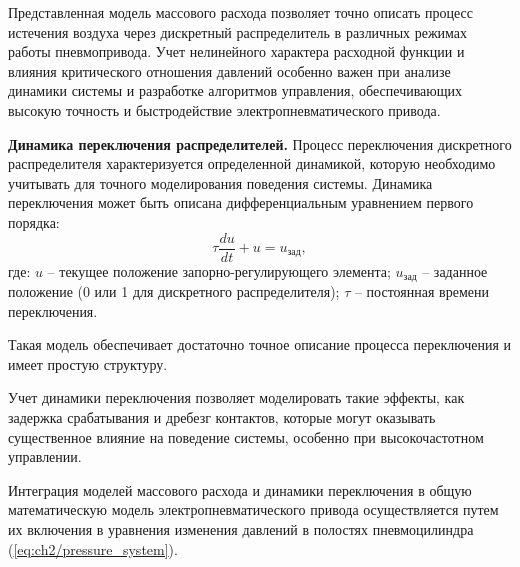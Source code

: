 Представленная модель массового расхода позволяет точно описать процесс истечения
воздуха через дискретный распределитель в различных режимах работы
пневмопривода. Учет нелинейного характера расходной функции и
влияния критического отношения давлений особенно важен при анализе динамики
системы и разработке алгоритмов управления, обеспечивающих высокую точность
и быстродействие электропневматического привода.

\textbf{Динамика переключения распределителей.}
Процесс переключения дискретного распределителя характеризуется
определенной динамикой, которую необходимо учитывать для точного моделирования поведения
системы. Динамика переключения может быть описана дифференциальным уравнением первого порядка:
\begin{equation}
	\label{eq:ch2/switching_dynamics}
	\tau \frac{du}{dt} + u = u_{\text{зад}},
\end{equation}
где:
$u$ -- текущее положение запорно-регулирующего элемента;
$u_{\text{зад}}$ -- заданное положение (0 или 1 для дискретного распределителя);
$\tau$ -- постоянная времени переключения.

Такая модель обеспечивает достаточно точное описание процесса переключения
и имеет простую структуру.

Учет динамики переключения позволяет моделировать такие эффекты, как задержка
срабатывания и дребезг контактов, которые могут оказывать
существенное влияние на поведение системы,
особенно при высокочастотном управлении.

Интеграция моделей массового расхода и динамики переключения
в общую математическую модель электропневматического привода
осуществляется путем их включения в уравнения
изменения давлений в полостях пневмоцилиндра (\ref{eq:ch2/pressure_system}).
